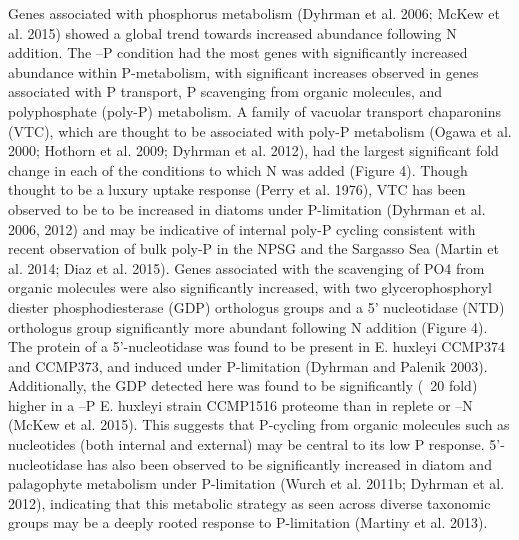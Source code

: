 Genes associated with phosphorus metabolism (Dyhrman et al. 2006; McKew et al. 2015) showed a global trend towards increased abundance following N addition. The –P condition had the most genes with significantly increased abundance within P-metabolism, with significant increases observed in genes associated with P transport, P scavenging from organic molecules, and polyphosphate (poly-P) metabolism. A family of vacuolar transport chaparonins (VTC), which are thought to be associated with poly-P metabolism (Ogawa et al. 2000; Hothorn et al. 2009; Dyhrman et al. 2012), had the largest significant fold change in each of the conditions to which N was added (Figure 4). Though thought to be a luxury uptake response (Perry et al. 1976), VTC has been observed to be to be increased in diatoms under P-limitation (Dyhrman et al. 2006, 2012) and may be indicative of internal poly-P cycling consistent with recent observation of bulk poly-P in the NPSG and the Sargasso Sea (Martin et al. 2014; Diaz et al. 2015). Genes associated with the scavenging of PO4 from organic molecules were also significantly increased, with two glycerophosphoryl diester phosphodiesterase (GDP) orthologus groups and a 5’ nucleotidase (NTD) orthologus group significantly more abundant following N addition (Figure 4). The protein of a 5’-nucleotidase was found to be present in E. huxleyi CCMP374 and CCMP373, and induced under P-limitation (Dyhrman and Palenik 2003). Additionally, the GDP detected here was found to be significantly (~20 fold) higher in a –P E. huxleyi strain CCMP1516 proteome than in replete or –N (McKew et al. 2015). This suggests that P-cycling from organic molecules such as nucleotides (both internal and external) may be central to its low P response. 5’-nucleotidase has also been observed to be significantly increased in diatom and palagophyte metabolism under P-limitation (Wurch et al. 2011b; Dyhrman et al. 2012), indicating that this metabolic strategy as seen across diverse taxonomic groups may be a deeply rooted response to P-limitation (Martiny et al. 2013).
